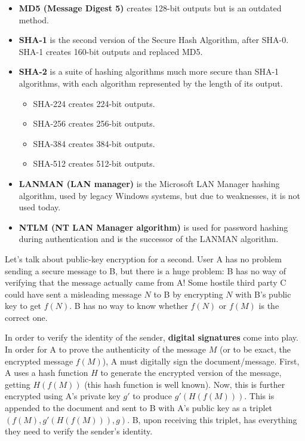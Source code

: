 \documentclass{article}
\begin{document}
\begin{enumerate}
      \begin{itemize}
        \item \textbf{MD5 (Message Digest 5)} creates 128-bit outputs but is an outdated method.
        \item \textbf{SHA-1} is the second version of the Secure Hash Algorithm, after SHA-0. SHA-1 creates 160-bit outputs and replaced MD5.
        \item \textbf{SHA-2} is a suite of hashing algorithms much more secure than SHA-1 algorithms, with each algorithm represented by the length of its output.
        \begin{itemize}
          \item SHA-224 creates 224-bit outputs.
          \item SHA-256 creates 256-bit outputs.
          \item SHA-384 creates 384-bit outputs.
          \item SHA-512 creates 512-bit outputs.
        \end{itemize}
        \item \textbf{LANMAN (LAN manager)} is the Microsoft LAN Manager hashing algorithm, used by legacy Windows systems, but due to weaknesses, it is not used today.
        \item \textbf{NTLM (NT LAN Manager algorithm)} is used for password hashing during authentication and is the successor of the LANMAN algorithm.
      \end{itemize}
    \end{enumerate}

    Let's talk about public-key encryption for a second. User A has no problem sending a secure message to B, but there is a huge problem: B has no way of verifying that the message actually came from A! Some hostile third party C could have sent a misleading message $N$ to B by encrypting $N$ with B's public key to get $f(N)$. B has no way to know whether $f(N)$ or $f(M)$ is the correct one.

    In order to verify the identity of the sender, \textbf{digital signatures} come into play. In order for A to prove the authenticity of the message $M$ (or to be exact, the encrypted message $f(M)$), A must digitally sign the document/message. First, A uses a hash function $H$ to generate the encrypted version of the message, getting $H(f(M))$ (this hash function is well known). Now, this is further encrypted using A's private key $g'$ to produce $g'(H(f(M)))$. This is appended to the document and sent to B with A's public key as a triplet $(f(M), g'(H(f(M))), g)$. B, upon receiving this triplet, has everything they need to verify the sender's identity.
\end{document}
